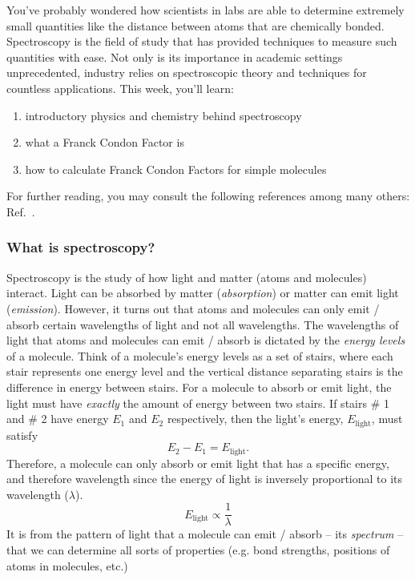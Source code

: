 \documentclass[12pt]{article}
\begin{document}
You've probably wondered how scientists in labs are able to determine extremely small quantities like the distance between atoms that are chemically bonded.
Spectroscopy is the field of study that has provided techniques to measure such quantities with ease. Not only is its importance in academic settings unprecedented, industry relies on spectroscopic theory and techniques for countless applications. This week, you'll learn:
\begin{enumerate}
    \item introductory physics and chemistry behind spectroscopy
    \item what a Franck Condon Factor is
    \item how to calculate Franck Condon Factors for simple molecules
\end{enumerate}
For further reading, you may consult the following references among many others: Ref.~\cite{quesadaFranckCondonFactorsCounting2019,wrightFranckCondonFactorsTheir1999,fantzFranckCondonFactors2006}.

\subsubsection{What is spectroscopy?}

Spectroscopy is the study of how light and matter (atoms and molecules) interact.
Light can be absorbed by matter (\textit{absorption}) or matter can emit light (\textit{emission}).
However, it turns out that atoms and molecules can only emit / absorb certain wavelengths of light and not all wavelengths.
The wavelengths of light that atoms and molecules can emit / absorb is dictated by the \textit{energy levels} of a molecule.
Think of a molecule's energy levels as a set of stairs, where each stair represents one energy level and the vertical distance separating stairs is the difference in energy between stairs.
For a molecule to absorb or emit light, the light must have \textit{exactly} the amount of energy between two stairs.
If stairs \# 1 and \# 2 have energy $E_1$ and $E_2$ respectively, then the light's energy, $E_{\text{light}}$, must satisfy
\begin{equation}
    E_2 - E_1 = E_{\text{light}}.
\end{equation}
Therefore, a molecule can only absorb or emit light that has a specific energy, and therefore wavelength since the energy of light is inversely proportional to its wavelength ($\lambda$).
\begin{equation}
    E_{\text{light}} \propto \frac{1}{\lambda}
\end{equation}
It is from the pattern of light that a molecule can emit / absorb -- its \textit{spectrum} -- that we can determine all sorts of properties (e.g. bond strengths, positions of atoms in molecules, etc.)
\end{document}
